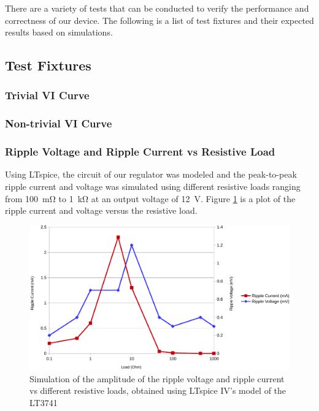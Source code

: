 There are a variety of tests that can be conducted to verify the performance and
correctness of our  device.  The  following is a list of test fixtures and their
expected results based on simulations.

\subsection{Test Fixtures}

\subsubsection{Trivial VI Curve}


\subsubsection{Non-trivial VI Curve}


\subsubsection{Ripple Voltage and Ripple Current vs Resistive Load}

Using LTspice\cite{ref:ltspice}, the circuit  of  our  regulator was modeled and
the  peak-to-peak  ripple  current  and  voltage  was  simulated using different
resistive  loads ranging from \SI{100}{\milli\ohm} to  \SI{1}{\kilo\ohm}  at  an
output  voltage of \SI{12}{\volt}. Figure \ref{fig:verification:ripple_sim} is a
plot  of  the   ripple   current   and   voltage   versus  the  resistive  load.

\begin{figure}[th!]
    \centering
    \includegraphics[width=.7\textwidth]{images/sim/ripple-vs-load.pdf}
    \caption{Simulation of the amplitude of the ripple voltage and ripple current vs different resistive loads, obtained using LTspice IV's model of the LT3741}
    \label{fig:verification:ripple_sim}
\end{figure}

